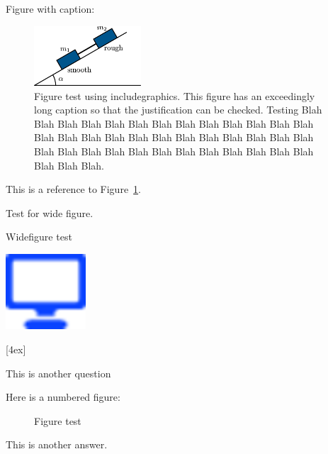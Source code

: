 \documentclass[solutionsatend,twocolumnsolutions]{ouunit}
\begin{document}
Figure with caption:
\begin{figure}
\caption{Figure test using includegraphics\label{fig-test-includegraphics}. This figure has an exceedingly long caption so that the justification can be checked. Testing Blah Blah Blah Blah Blah Blah Blah Blah Blah Blah Blah Blah Blah Blah Blah Blah Blah Blah Blah Blah Blah Blah Blah Blah Blah Blah Blah Blah Blah Blah Blah Blah Blah Blah Blah Blah Blah Blah Blah Blah.}\label{fig-test-tikz}
\includegraphics[width=4cm]{test}
\end{figure}

This is a reference to Figure~\ref{fig-test-tikz}.

Test for wide figure.

\lipsum[134]

\begin{widefigure}
\caption{Widefigure test\label{fig-test-widefigure-one}}
\end{widefigure}


\lipsum[134]
\begin{marginfigure*}
\includegraphics[width=3cm]{icon}
\end{marginfigure*}
[4ex]

\lipsum[133]

\begin{exercise}\label{exe-fig-test}
This is another question
\begin{solution}
Here is a numbered figure:
\begin{figure}
\caption{Figure test \label{fig-placement-test}}
\end{figure}
This is another answer.
\end{solution}
\end{exercise}
\end{document}
